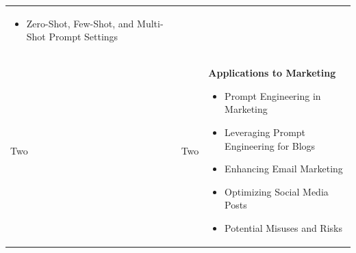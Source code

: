 \documentclass[a4paper, 11pt]{article}
\begin{document}
\begin{center}
\begin{tabular}{ |p{1cm}|p{1cm}||p{10cm}|  }
\begin{itemize}[itemsep=0pt]
\item Zero-Shot, Few-Shot, and Multi-Shot Prompt Settings
\end{itemize} 
\\
Two  &   Two  & \textbf{Applications to Marketing}
 \begin{itemize}[itemsep=0pt]
\item Prompt Engineering in Marketing
\item Leveraging Prompt Engineering for Blogs
\item Enhancing Email Marketing
\item Optimizing Social Media Posts 
\item Potential Misuses and Risks 
\end{itemize} 
\\
 \hline
\end{tabular}
\end{center}
\end{document}
